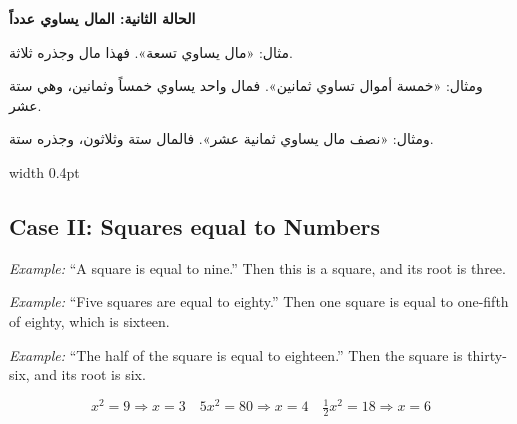 \documentclass[11pt,a4paper]{book}
\begin{document}
\vspace{0.5cm}

\noindent\begin{minipage}[t]{0.48\textwidth}
\raggedleft

\begin{Arabic}
\textbf{الحالة الثانية: المال يساوي عدداً}

مثال: «مال يساوي تسعة». فهذا مال وجذره ثلاثة.

ومثال: «خمسة أموال تساوي ثمانين». فمال واحد يساوي خمساً وثمانين، وهي ستة عشر.

ومثال: «نصف مال يساوي ثمانية عشر». فالمال ستة وثلاثون، وجذره ستة.
\end{Arabic}

\end{minipage}%
\hfill\vrule width 0.4pt\hfill
\begin{minipage}[t]{0.48\textwidth}
\raggedright

\subsection*{Case II: Squares equal to Numbers}

\textit{Example:} ``A square is equal to nine.'' Then this is a square, and its root is three.

\textit{Example:} ``Five squares are equal to eighty.'' Then one square is equal to one-fifth of eighty, which is sixteen.

\textit{Example:} ``The half of the square is equal to eighteen.'' Then the square is thirty-six, and its root is six.

\begin{equation}
\boxed{x^2 = 9 \Rightarrow x = 3} \quad
\boxed{5x^2 = 80 \Rightarrow x = 4} \quad
\boxed{\tfrac{1}{2}x^2 = 18 \Rightarrow x = 6}
\end{equation}

\end{minipage}
\vspace{0.3cm}

\vspace{0.5cm}
\end{document}
